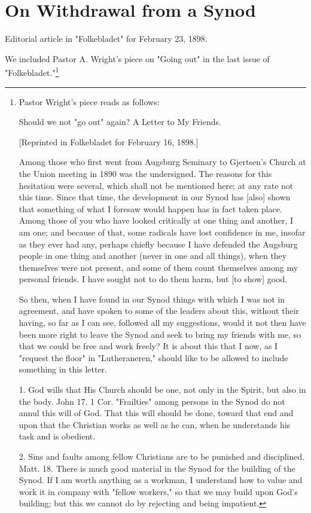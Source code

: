 
\section{On Withdrawal from a Synod}

Editorial article in "Folkebladet" for February 23, 1898.



We included Pastor A. Wright’s piece on "Going out" in the last issue of "Folkebladet."\footnote{
Pastor Wright’s piece reads as follows:

Should we not "go out" again?
A Letter to My Friends.

[Reprinted in Folkebladet for February 16, 1898.]

Among those who first went from Augsburg Seminary to Gjertsen’s Church at the Union meeting in 1890 was the undersigned. The reasons for this hesitation were several, which shall not be mentioned here; at any rate not this time. Since that time, the development in our Synod has [also] shown that something of what I foresaw would happen has in fact taken place. Among those of you who have looked critically at one thing and another, I am one; and because of that, some radicals have lost confidence in me, insofar as they ever had any, perhaps chiefly because I have defended the Augsburg people in one thing and another (never in one and all things), when they themselves were not present, and some of them count themselves among my personal friends. I have sought not to do them harm, but [to show] good.

So then, when I have found in our Synod things with which I was not in agreement, and have spoken to some of the leaders about this, without their having, so far as I can see, followed all my suggestions, would it not then have been more right to leave the Synod and seek to bring my friends with me, so that we could be free and work freely? It is about this that I now, as I "request the floor" in "Lutheraneren," should like to be allowed to include something in this letter.

1. God wills that His Church should be one, not only in the Spirit, but also in the body. John 17. 1 Cor. "Frailties" among persons in the Synod do not annul this will of God. That this will should be done, toward that end and upon that the Christian works as well as he can, when he understands his task and is obedient.

2. Sins and faults among fellow Christians are to be punished and disciplined. Matt. 18. There is much good material in the Synod for the building of the Synod. If I am worth anything as a workman, I understand how to value and work it in company with "fellow workers," so that we may build upon God’s building; but this we cannot do by rejecting and being impatient.

}
